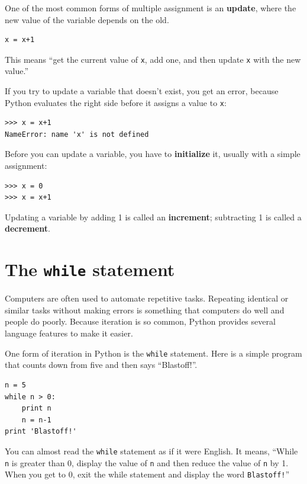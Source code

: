 \documentclass[10pt]{book}
\begin{document}

One of the most common forms of multiple assignment is an {\bf update},
where the new value of the variable depends on the old.

\beforeverb
\begin{verbatim}
x = x+1
\end{verbatim}
\afterverb
%
This means ``get the current value of {\tt x}, add one, and then
update {\tt x} with the new value.''

If you try to update a variable that doesn't exist, you get an
error, because Python evaluates the right side before it assigns
a value to {\tt x}:

\beforeverb
\begin{verbatim}
>>> x = x+1
NameError: name 'x' is not defined
\end{verbatim}
\afterverb
%
Before you can update a variable, you have to {\bf initialize}
it, usually with a simple assignment:


\beforeverb
\begin{verbatim}
>>> x = 0
>>> x = x+1
\end{verbatim}
\afterverb
%
Updating a variable by adding 1 is called an {\bf increment};
subtracting 1 is called a {\bf decrement}.





\section{The {\tt while} statement}


Computers are often used to automate repetitive tasks.  Repeating
identical or similar tasks without making errors is something that
computers do well and people do poorly.
Because iteration is so common, Python provides several
language features to make it easier.  

One form of iteration in Python is the {\tt while} statement.  Here is 
a simple program that counts down from five and then says ``Blastoff!''.

\beforeverb
\begin{verbatim}
n = 5
while n > 0:
    print n
    n = n-1
print 'Blastoff!'
\end{verbatim}
\afterverb
%
You can almost read the {\tt while} statement as if it were English.
It means, ``While {\tt n} is greater than 0,
display the value of {\tt n} and then reduce the value of
{\tt n} by 1.  When you get to 0, exit the while statement and
display the word {\tt Blastoff!}''
\end{document}
